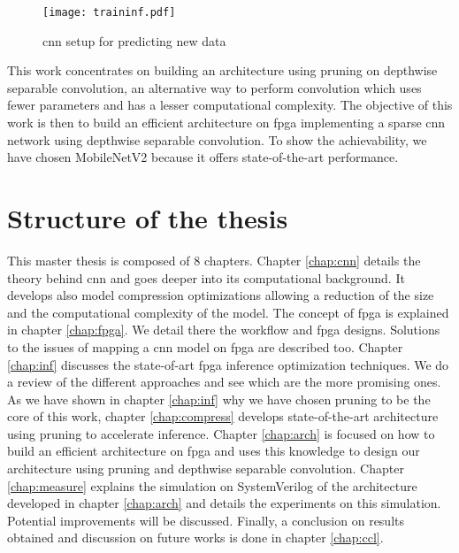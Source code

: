 %
\begin{figure}
    \texttt{[image: traininf.pdf]}
    \caption{\acrshort{cnn} setup for predicting new data}
    \label{fig:traininf}
\end{figure}\newline \newline
%
This work concentrates on building an architecture using pruning on depthwise separable convolution, an alternative way to perform convolution which uses fewer parameters and has a lesser computational complexity. The objective of this work is then to build an efficient architecture on \acrshort{fpga} implementing a sparse \acrshort{cnn} network using depthwise separable convolution. To show the achievability, we have chosen MobileNetV2 because it offers state-of-the-art performance.
%
%
\section*{Structure of the thesis}
%
%
This master thesis is composed of 8 chapters. \newline \newline
%
Chapter \ref{chap:cnn} details the theory behind \acrshort{cnn} and goes deeper into its computational background. It develops also model compression optimizations allowing a reduction of the size and the computational complexity of the model. \newline \newline
%
The concept of \acrshort{fpga} is explained in chapter \ref{chap:fpga}. We detail there the workflow and \acrshort{fpga} designs. Solutions to the issues of mapping a \acrshort{cnn} model on \acrshort{fpga} are described too. \newline \newline
%
Chapter \ref{chap:inf} discusses the state-of-art \acrshort{fpga} inference optimization techniques. We do a review of the different approaches and see which are the more promising ones. \newline \newline
%
As we have shown in chapter \ref{chap:inf} why we have chosen pruning to be the core of this work, chapter \ref{chap:compress} develops state-of-the-art architecture using pruning to accelerate inference.
%
Chapter \ref{chap:arch} is focused on how to build an efficient architecture on \acrshort{fpga} and uses this knowledge to design our architecture using pruning and depthwise separable convolution.\newline \newline
%
Chapter \ref{chap:measure} explains the simulation on SystemVerilog of the architecture developed in chapter \ref{chap:arch} and details the experiments on this simulation. Potential improvements will be discussed.\newline \newline
%
Finally, a conclusion on results obtained and discussion on future works is done in chapter \ref{chap:ccl}.
\afterpage{\blankpage}
\cleardoublepage
\newpage
